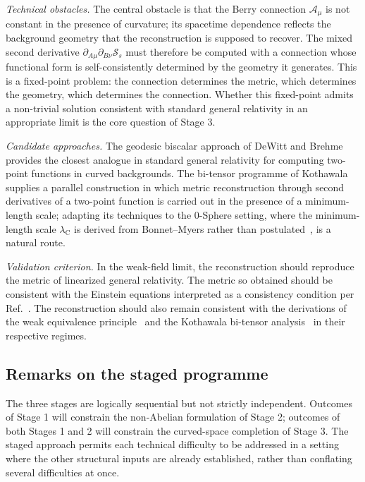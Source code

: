 \documentclass[%
 reprint, amsmath,amssymb, aps, prb, ]{revtex4-2}
\numberwithin{equation}{section}
\newcommand{\lambdaC}{\lambda_{\mathrm{C}}}
\begin{document}
\textit{Technical obstacles.} The central obstacle is that the Berry connection $\mathcal{A}_\mu$ is not constant in the presence of curvature; its spacetime dependence reflects the background geometry that the reconstruction is supposed to recover. The mixed second derivative $\partial_{A\mu}\partial_{B\nu}\mathcal{S}_s$ must therefore be computed with a connection whose functional form is self-consistently determined by the geometry it generates. This is a fixed-point problem: the connection determines the metric, which determines the geometry, which determines the connection. Whether this fixed-point admits a non-trivial solution consistent with standard general relativity in an appropriate limit is the core question of Stage 3.

\textit{Candidate approaches.} The geodesic biscalar approach of DeWitt and Brehme~\cite{DeWittBrehme1960} provides the closest analogue in standard general relativity for computing two-point functions in curved backgrounds. The bi-tensor programme of Kothawala~\cite{Kothawala2023} supplies a parallel construction in which metric reconstruction through second derivatives of a two-point function is carried out in the presence of a minimum-length scale; adapting its techniques to the 0-Sphere setting, where the minimum-length scale $\lambdaC$ is derived from Bonnet--Myers rather than postulated~\cite{hanamura51}, is a natural route.

\textit{Validation criterion.} In the weak-field limit, the reconstruction should reproduce the metric of linearized general relativity. The metric so obtained should be consistent with the Einstein equations interpreted as a consistency condition per Ref.~\cite{hanamura30}. The reconstruction should also remain consistent with the derivations of the weak equivalence principle~\cite{hanamura52} and the Kothawala bi-tensor analysis~\cite{Kothawala2023} in their respective regimes.

\subsection{Remarks on the staged programme}
\label{app:remarks}

The three stages are logically sequential but not strictly independent. Outcomes of Stage 1 will constrain the non-Abelian formulation of Stage 2; outcomes of both Stages 1 and 2 will constrain the curved-space completion of Stage 3. The staged approach permits each technical difficulty to be addressed in a setting where the other structural inputs are already established, rather than conflating several difficulties at once.
\end{document}
